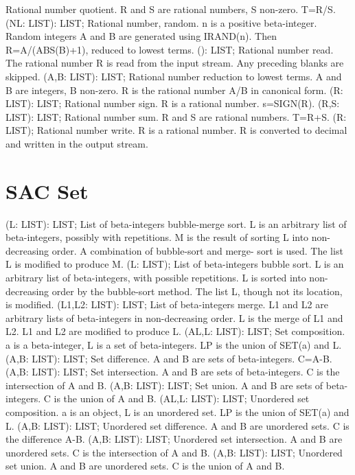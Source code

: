 \bcom Rational number quotient. R and S are rational numbers, S non-zero.
T=R/S. \ecom 
{} (NL: LIST): LIST; \eproc
\bcom Rational number, random. n is a positive beta-integer. Random
integers A and B are generated using IRAND(n).  Then R=A/(ABS(B)+1),
reduced to lowest terms. \ecom 
{} (): LIST; \eproc
\bcom Rational number read. The rational number R is read from the input
stream. Any preceding blanks are skipped. \ecom 
{} (A,B: LIST): LIST; \eproc
\bcom Rational number reduction to lowest terms. A and B are integers,
B non-zero. R is the rational number A/B in canonical form. \ecom 
{} (R: LIST): LIST; \eproc
\bcom Rational number sign. R is a rational number. s=SIGN(R). \ecom 
{} (R,S: LIST): LIST; \eproc
\bcom Rational number sum. R and S are rational numbers. T=R+S. \ecom 
{} (R: LIST); \eproc
\bcom Rational number write. R is a rational number. R is converted
to decimal and written in the output stream. \ecom 
\section{ SAC Set  } 
 (L: LIST): LIST; \eproc
\bcom List of beta-integers bubble-merge sort. L is an arbitrary list of
beta-integers, possibly with repetitions.  M is the result of sorting
L into non-decreasing order.  A combination of bubble-sort and merge-
sort is used. The list L is modified to produce M. \ecom 
{} (L: LIST); \eproc
\bcom List of beta-integers bubble sort. L is an arbitrary list of
beta-integers, with possible repetitions.  L is sorted into
non-decreasing order by the bubble-sort method.  The list L, though not
its location, is modified. \ecom 
{} (L1,L2: LIST): LIST; \eproc
\bcom List of beta-integers merge. L1 and L2 are arbitrary lists of
beta-integers in non-decreasing order.  L is the merge of L1 and L2.
L1 and L2 are modified to produce L. \ecom 
{} (AL,L: LIST): LIST; \eproc
\bcom Set composition. a is a beta-integer, L is a set of beta-integers.
LP is the union of SET(a) and L.  \ecom 
{} (A,B: LIST): LIST; \eproc
\bcom Set difference. A and B are sets of beta-integers. C=A-B. \ecom 
{} (A,B: LIST): LIST; \eproc
\bcom Set intersection. A and B are sets of beta-integers. C is the
intersection of A and B. \ecom 
{} (A,B: LIST): LIST; \eproc
\bcom Set union. A and B are sets of beta-integers. C is the union of
A and B. \ecom 
{} (AL,L: LIST): LIST; \eproc
\bcom Unordered set composition. a is an object, L is an unordered set.
LP is the union of SET(a) and L.  \ecom 
{} (A,B: LIST): LIST; \eproc
\bcom Unordered set difference. A and B are unordered sets. C is the
difference A-B. \ecom 
{} (A,B: LIST): LIST; \eproc
\bcom Unordered set intersection. A and B are unordered sets. C is the
intersection of A and B. \ecom 
{} (A,B: LIST): LIST; \eproc
\bcom Unordered set union. A and B are unordered sets. C is the union
of A and B. \ecom 
